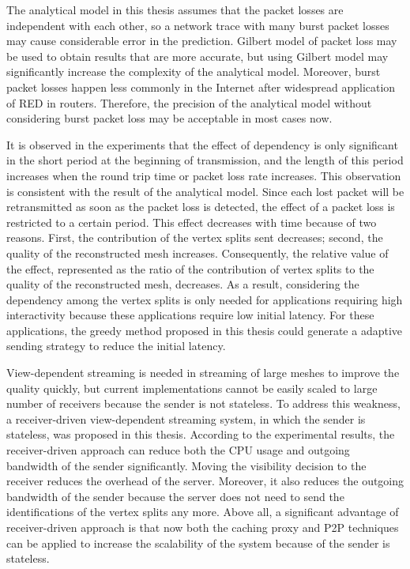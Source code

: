 \documentclass[11pt, a4paper]{report}
\begin{document}
The analytical model in this thesis assumes that the packet losses 
are independent with each other, 
so a network trace with many burst packet losses may cause considerable error in the prediction. 
Gilbert model of packet loss may be used to obtain results that are more accurate, 
but using Gilbert model may significantly increase the complexity of the analytical model. 
Moreover, burst packet losses happen less commonly in the Internet
after widespread application of RED in routers. 
Therefore, the precision of the analytical model
without considering burst packet loss may be acceptable in most cases now.

It is observed in the experiments that the effect of dependency
is only significant in the short period at the beginning of transmission, 
and the length of this period increases
when the round trip time or packet loss rate increases. 
This observation is consistent with the result of the analytical model. 
Since each lost packet will be retransmitted as soon as the packet loss is detected, 
the effect of a packet loss is restricted to a certain period. 
This effect decreases with time because of two reasons. 
First, the contribution of the vertex splits sent decreases; 
second, the quality of the reconstructed mesh increases. 
Consequently, the relative value of the effect, 
represented as the ratio of the contribution of vertex
splits to the quality of the reconstructed mesh, decreases.
As a result, considering the dependency among the vertex splits 
is only needed for applications requiring high interactivity
because these applications require low initial latency. 
For these applications, the greedy method proposed in this thesis
could generate a adaptive sending strategy to reduce the initial latency. 

View-dependent streaming is needed in streaming of large meshes
to improve the quality quickly, but current implementations cannot be easily scaled
to large number of receivers because the sender is not stateless. 
To address this weakness, a receiver-driven view-dependent streaming system,
in which the sender is stateless, was proposed in this thesis. 
According to the experimental results, the receiver-driven approach
can reduce both the CPU usage and outgoing bandwidth of the sender significantly. 
Moving the visibility decision to the receiver reduces the overhead of the server. 
Moreover, it also reduces the outgoing bandwidth of the sender because the server
does not need to send the identifications of the vertex splits any more. 
Above all, a significant advantage of receiver-driven approach is that
now both the caching proxy and P2P techniques can be applied to increase the scalability of the system
because of the sender is stateless. 
\end{document}
